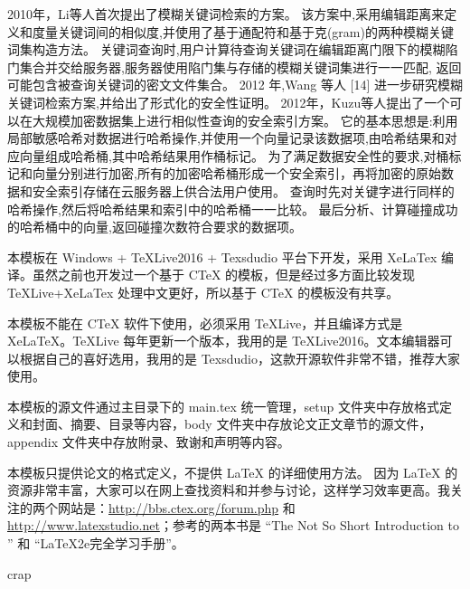 2010年，Li等人首次提出了模糊关键词检索的方案。
该方案中,采用编辑距离来定义和度量关键词间的相似度,并使用了基于通配符和基于克(gram)的两种模糊关键词集构造方法。
关键词查询时,用户计算待查询关键词在编辑距离门限下的模糊陷门集合并交给服务器,服务器使用陷门集与存储的模糊关键词集进行一一匹配,
返回可能包含被查询关键词的密文文件集合。
2012 年,Wang 等人 [14] 进一步研究模糊关键词检索方案,并给出了形式化的安全性证明。
2012年，Kuzu等人提出了一个可以在大规模加密数据集上进行相似性查询的安全索引方案。
它的基本思想是:利用局部敏感哈希对数据进行哈希操作,并使用一个向量记录该数据项,由哈希结果和对应向量组成哈希桶,其中哈希结果用作桶标记。
为了满足数据安全性的要求,对桶标记和向量分别进行加密,所有的加密哈希桶形成一个安全索引，再将加密的原始数据和安全索引存储在云服务器上供合法用户使用。
查询时先对关键字进行同样的哈希操作,然后将哈希结果和索引中的哈希桶一一比较。
最后分析、计算碰撞成功的哈希桶中的向量,返回碰撞次数符合要求的数据项。


本模板在 Windows + TeXLive2016 + Texsdudio 平台下开发，采用 XeLaTex 编译。虽然之前也开发过一个基于 CTeX 的模板，但是经过多方面比较发现 TeXLive+XeLaTex 处理中文更好，所以基于 CTeX 的模板没有共享。

{\color{red}本模板不能在 CTeX 软件下使用，必须采用 TeXLive，并且编译方式是 XeLaTeX。TeXLive 每年更新一个版本，我用的是 TeXLive2016。文本编辑器可以根据自己的喜好选用，我用的是 Texsdudio，这款开源软件非常不错，推荐大家使用。}

本模板的源文件通过主目录下的 main.tex 统一管理，setup 文件夹中存放格式定义和封面、摘要、目录等内容，body 文件夹中存放论文正文章节的源文件，appendix 文件夹中存放附录、致谢和声明等内容。

本模板只提供论文的格式定义，不提供 \LaTeX{} 的详细使用方法。%
因为 \LaTeX{} 的资源非常丰富，大家可以在网上查找资料和并参与讨论，这样学习效率更高。我关注的两个网站是：\url{http://bbs.ctex.org/forum.php} 和 \url{http://www.latexstudio.net}；参考的两本书是 ``The Not So Short Introduction to \LaTeXe'' 和 ``LaTeX2e完全学习手册''。


crap